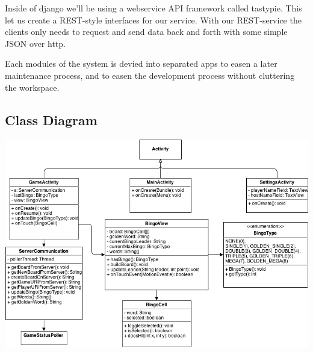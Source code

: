 Inside of django we'll be using a webservice API framework called tastypie. This let us create a REST-style interfaces for our service. With our REST-service the clients only needs to request and send data back and forth with some simple JSON over http.

Each modules of the system is devied into separated apps to easen a later maintenance process, and to easen the development process without cluttering the workspace.

\subsection{Class Diagram}

\begin{center}
\includegraphics[scale=0.5]{Pikks/ClassDiagramFinal}
\end{center}